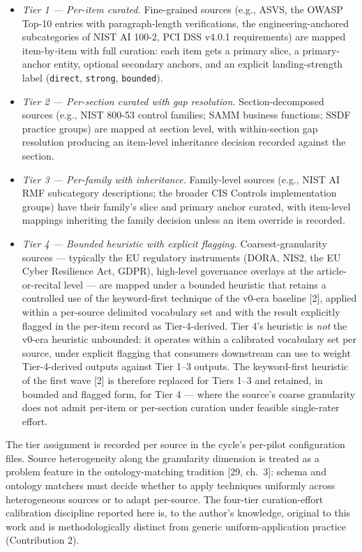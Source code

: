 \documentclass[
]{article}
\providecommand{\tightlist}{%
  \setlength{\itemsep}{0pt}\setlength{\parskip}{0pt}}
\begin{document}
\begin{itemize}
\tightlist
\item
  \emph{Tier 1 --- Per-item curated.} Fine-grained sources (e.g., ASVS,
  the OWASP Top-10 entries with paragraph-length verifications, the
  engineering-anchored subcategories of NIST AI 100-2, PCI DSS v4.0.1
  requirements) are mapped item-by-item with full curation: each item
  gets a primary slice, a primary-anchor entity, optional secondary
  anchors, and an explicit landing-strength label (\texttt{direct},
  \texttt{strong}, \texttt{bounded}).
\item
  \emph{Tier 2 --- Per-section curated with gap resolution.}
  Section-decomposed sources (e.g., NIST 800-53 control families; SAMM
  business functions; SSDF practice groups) are mapped at section level,
  with within-section gap resolution producing an item-level inheritance
  decision recorded against the section.
\item
  \emph{Tier 3 --- Per-family with inheritance.} Family-level sources
  (e.g., NIST AI RMF subcategory descriptions; the broader CIS Controls
  implementation groups) have their family's slice and primary anchor
  curated, with item-level mappings inheriting the family decision
  unless an item override is recorded.
\item
  \emph{Tier 4 --- Bounded heuristic with explicit flagging.}
  Coarsest-granularity sources --- typically the EU regulatory
  instruments (DORA, NIS2, the EU Cyber Resilience Act, GDPR),
  high-level governance overlays at the article-or-recital level --- are
  mapped under a bounded heuristic that retains a controlled use of the
  keyword-first technique of the v0-era baseline {[}2{]}, applied within
  a per-source delimited vocabulary set and with the result explicitly
  flagged in the per-item record as Tier-4-derived. Tier 4's heuristic
  is \emph{not} the v0-era heuristic unbounded: it operates within a
  calibrated vocabulary set per source, under explicit flagging that
  consumers downstream can use to weight Tier-4-derived outputs against
  Tier 1--3 outputs. The keyword-first heuristic of the first wave
  {[}2{]} is therefore replaced for Tiers 1--3 and retained, in bounded
  and flagged form, for Tier 4 --- where the source's coarse granularity
  does not admit per-item or per-section curation under feasible
  single-rater effort.
\end{itemize}

The tier assignment is recorded per source in the cycle's per-pilot
configuration files. Source heterogeneity along the granularity
dimension is treated as a problem feature in the ontology-matching
tradition {[}29, ch.~3{]}: schema and ontology matchers must decide
whether to apply techniques uniformly across heterogeneous sources or to
adapt per-source. The four-tier curation-effort calibration discipline
reported here is, to the author's knowledge, original to this work and
is methodologically distinct from generic uniform-application practice
(Contribution 2).
\end{document}
